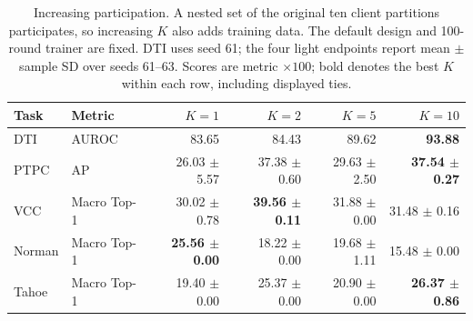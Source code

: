 \begin{table}[htbp]
\caption{Increasing participation. A nested set of the original ten client partitions participates, so increasing $K$ also adds training data. The default design and 100-round trainer are fixed. DTI uses seed 61; the four light endpoints report mean $\pm$ sample SD over seeds 61--63. Scores are metric $\times100$; bold denotes the best $K$ within each row, including displayed ties.}
\label{tab:completed-participation}
\centering\small
\setlength{\tabcolsep}{4pt}
\begin{tabularx}{\linewidth}{@{}lXrrrr@{}}
\toprule
Task & Metric & $K=1$ & $K=2$ & $K=5$ & $K=10$ \\
\midrule
DTI & AUROC & 83.65 & 84.43 & 89.62 & \textbf{93.88} \\
PTPC & AP & 26.03 $\pm$ 5.57 & 37.38 $\pm$ 0.60 & 29.63 $\pm$ 2.50 & \textbf{37.54 $\pm$ 0.27} \\
VCC & Macro Top-1 & 30.02 $\pm$ 0.78 & \textbf{39.56 $\pm$ 0.11} & 31.88 $\pm$ 0.00 & 31.48 $\pm$ 0.16 \\
Norman & Macro Top-1 & \textbf{25.56 $\pm$ 0.00} & 18.22 $\pm$ 0.00 & 19.68 $\pm$ 1.11 & 15.48 $\pm$ 0.00 \\
Tahoe & Macro Top-1 & 19.40 $\pm$ 0.00 & 25.37 $\pm$ 0.00 & 20.90 $\pm$ 0.00 & \textbf{26.37 $\pm$ 0.86} \\
\bottomrule
\end{tabularx}
\end{table}
